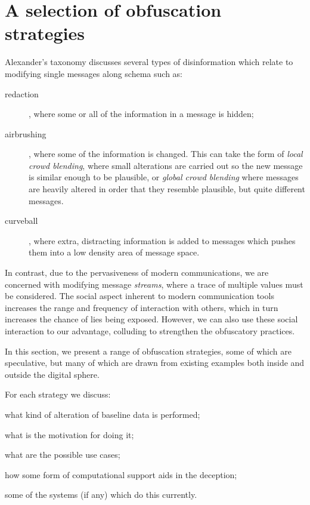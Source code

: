 \documentclass{IOS-Book-Article}     %
\begin{document}
\section{A selection of obfuscation strategies}
\label{sec:strategies}

Alexander's taxonomy \cite{alexander2010Disinformation} discusses several types
of disinformation which relate to modifying single messages along schema such
as:
\begin{description}
  \item[redaction], where some or all of the information in a message is
  hidden;
  \item[airbrushing], where some of the information is changed. This can take
  the form of \emph{local crowd blending}, where small alterations are carried
  out so the new message is similar enough to be plausible, or
  \emph{global crowd blending} where messages are heavily altered in order that
  they resemble plausible, but quite different messages.
  \item[curveball], where extra, distracting information is added to messages
  which pushes them into a low density area of message space.
\end{description}
In contrast, due to
the pervasiveness of modern communications, we are concerned with modifying
message \emph{streams}, where a trace of multiple values must be considered.
The social aspect inherent to modern communication tools increases the 
range and frequency of interaction with others, which in turn increases the 
chance of lies being exposed.
However, we can also use these social interaction to our advantage, colluding to
strengthen the obfuscatory practices. %

In this section, we present a range of obfuscation strategies, some of which are
speculative, but many of which are drawn from existing examples both inside and
outside the digital sphere.

For each strategy we discuss: \begin{inparaenum}
\item what kind of alteration of baseline data is performed;
\item what is the motivation for doing it; 
\item what are the possible use cases;
\item how some form of computational support aids in the deception;
\item some of the systems (if any) which do this currently.
\end{inparaenum}
\end{document}
